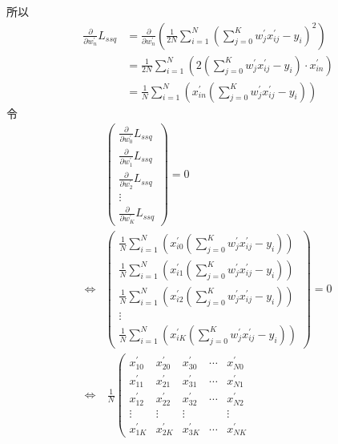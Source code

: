 \documentclass{article}
\begin{document}
所以
\begin{align*}
    \frac{\partial}{\partial w_n^\prime} L_{ssq} &= \frac{\partial}{\partial w_n^\prime} (\frac{1}{2N} \sum_{i = 1}^{N} (\sum_{j = 0}^{K} w_j^\prime x_{ij}^\prime - y_i)^2)\\
    &= \frac{1}{2N} \sum_{i = 1}^{N} (2(\sum_{j = 0}^{K} w_j^\prime x_{ij}^\prime - y_i) \cdot x_{in}^\prime)\\
    &= \frac{1}{N} \sum_{i = 1}^{N} (x_{in}^\prime(\sum_{j = 0}^{K} w_j^\prime x_{ij}^\prime - y_i))
\end{align*}
令
\begin{align*}
    &\left(
    \begin{array}{c}
        \frac{\partial}{\partial w_0^\prime} L_{ssq}\\
        \frac{\partial}{\partial w_1^\prime} L_{ssq}\\
        \frac{\partial}{\partial w_2^\prime} L_{ssq}\\
        \vdots\\
        \frac{\partial}{\partial w_K^\prime} L_{ssq} 
    \end{array}
    \right)
    = 0\\
    \Leftrightarrow
    &\left(
    \begin{array}{c}
        \frac{1}{N} \sum_{i = 1}^{N} (x_{i0}^\prime(\sum_{j = 0}^{K} w_j^\prime x_{ij}^\prime - y_i))\\
        \frac{1}{N} \sum_{i = 1}^{N} (x_{i1}^\prime(\sum_{j = 0}^{K} w_j^\prime x_{ij}^\prime - y_i))\\
        \frac{1}{N} \sum_{i = 1}^{N} (x_{i2}^\prime(\sum_{j = 0}^{K} w_j^\prime x_{ij}^\prime - y_i))\\
        \vdots\\
        \frac{1}{N} \sum_{i = 1}^{N} (x_{iK}^\prime(\sum_{j = 0}^{K} w_j^\prime x_{ij}^\prime - y_i))
    \end{array}
    \right)
    = 0\\
    \Leftrightarrow
    &\ \frac{1}{N} \left(
    \begin{array}{ccccc}
        x_{10}^\prime & x_{20}^\prime & x_{30}^\prime & \cdots & x_{N0}^\prime\\
        x_{11}^\prime & x_{21}^\prime & x_{31}^\prime & \cdots & x_{N1}^\prime\\
        x_{12}^\prime & x_{22}^\prime & x_{32}^\prime & \cdots & x_{N2}^\prime\\
        \vdots & \vdots & \vdots & \  & \vdots\\
        x_{1K}^\prime & x_{2K}^\prime & x_{3K}^\prime & \cdots & x_{NK}^\prime

\end{array}
\end{align*}
\end{document}
